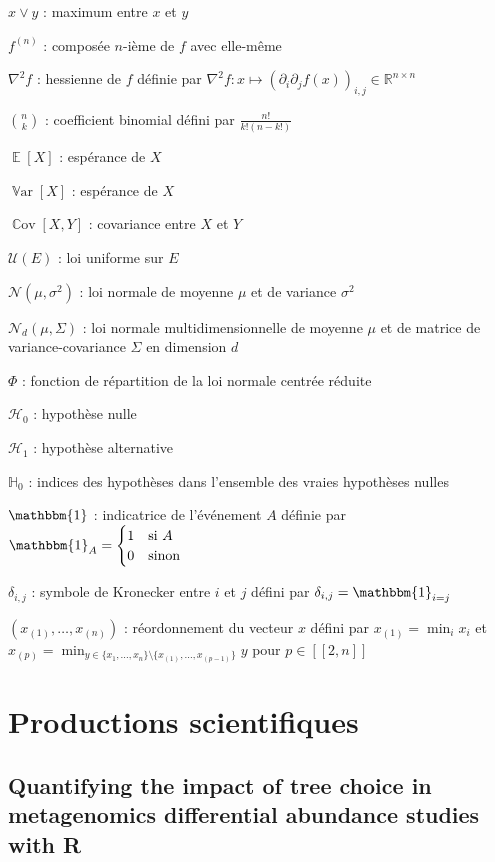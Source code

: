 \documentclass[12pt,a4paper]{reedthesis}
\newcommand \RR {\mathbb{R}}
\newcommand \indic {\mathbbm{1}}
\DeclareMathOperator*{\esp}{\mathbb{E}}
\DeclareMathOperator*{\var}{\mathbb{V}\text{ar}}
\DeclareMathOperator*{\cov}{\mathbb{C}\text{ov}}
\newcommand \EE [1]{\esp\left[{#1}\right]}
\newcommand \VV [1]{\var\left[{#1}\right]}
\newcommand \CC [1]{\cov\left[{#1}\right]}
\newcommand \unif [1] {\mathcal{U}\left({#1}\right)}
\newcommand \normal [2] {\mathcal{N}\left({#1},{#2}\right)}
\theoremstyle{definition}
\theoremstyle{definition}
\theoremstyle{definition}
\theoremstyle{remark}
\begin{document}
\(x \vee y\) : maximum entre \(x\) et \(y\)

\(f^{(n)}\) : composée \(n\)-ième de \(f\) avec elle-même

\(\nabla^2 f\) : hessienne de \(f\) définie par \(\nabla^2 f:x\mapsto \left(\partial_i\partial_jf(x)\right)_{i,j} \in \RR^{n\times n}\)

\(\binom{n}{k}\) : coefficient binomial défini par \(\frac{n!}{k!(n-k!)}\)

\(\EE{X}\) : espérance de \(X\)

\(\VV{X}\) : espérance de \(X\)

\(\CC{X,Y}\) : covariance entre \(X\) et \(Y\)

\(\unif{E}\) : loi uniforme sur \(E\)

\(\normal{\mu}{\sigma^2}\) : loi normale de moyenne \(\mu\) et de variance \(\sigma^2\)

\(\mathcal{N}_{d}\left(\mu,\Sigma\right)\) : loi normale multidimensionnelle de moyenne \(\mu\) et de matrice de variance-covariance \(\Sigma\) en dimension \(d\)

\(\Phi\) : fonction de répartition de la loi normale centrée réduite

\(\mathcal{H}_0\) : hypothèse nulle

\(\mathcal{H}_1\) : hypothèse alternative

\(\mathbb{H}_0\) : indices des hypothèses dans l'ensemble des vraies hypothèses nulles

\(\indic\) : indicatrice de l'événement \(A\) définie par \(\indic_{A} = \begin{cases}1 & \text{si }A\\ 0 & \text{sinon}\end{cases}\)

\(\delta_{i,j}\) : symbole de Kronecker entre \(i\) et \(j\) défini par \(\delta_{i,j} = \indic_{i=j}\)

\((x_{(1)}, \ldots, x_{(n)})\) : réordonnement du vecteur \(x\) défini par \(x_{(1)} = \min_i x_i\) et \(x_{(p)} = \min_{y \in \{x_1, \ldots, x_n\} \setminus \{x_{(1)}, \ldots, x_{(p - 1)}\}} y\) pour \(p \in [\![2,n]\!]\)

\hypertarget{productions-scientifiques}{%
\chapter{Productions scientifiques}\label{productions-scientifiques}}

\hypertarget{quantifying-the-impact-of-tree-choice-in-metagenomics-differential-abundance-studies-with-r}{%
\section*{Quantifying the impact of tree choice in metagenomics differential abundance studies with R}\label{quantifying-the-impact-of-tree-choice-in-metagenomics-differential-abundance-studies-with-r}}
\end{document}
